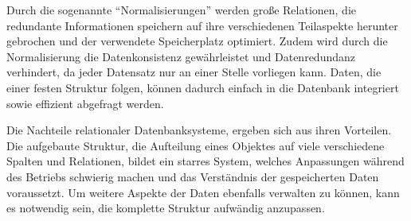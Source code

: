 Durch die sogenannte \enquote{Normalisierungen} werden große Relationen, die redundante Informationen speichern auf ihre verschiedenen Teilaspekte herunter gebrochen und der verwendete Speicherplatz optimiert.
Zudem wird durch die Normalisierung die Datenkonsistenz gewährleistet und Datenredundanz verhindert, da jeder Datensatz nur an einer Stelle vorliegen kann.
Daten, die einer festen Struktur folgen, können dadurch einfach in die Datenbank integriert sowie effizient abgefragt werden.

Die Nachteile relationaler Datenbanksysteme, ergeben sich aus ihren Vorteilen.
Die aufgebaute Struktur, die Aufteilung eines Objektes auf viele verschiedene Spalten und Relationen, bildet ein starres System, welches Anpassungen während des Betriebs schwierig machen und das Verständnis der gespeicherten Daten voraussetzt.
Um weitere Aspekte der Daten ebenfalls verwalten zu können, kann es notwendig sein, die komplette Struktur aufwändig anzupassen.
